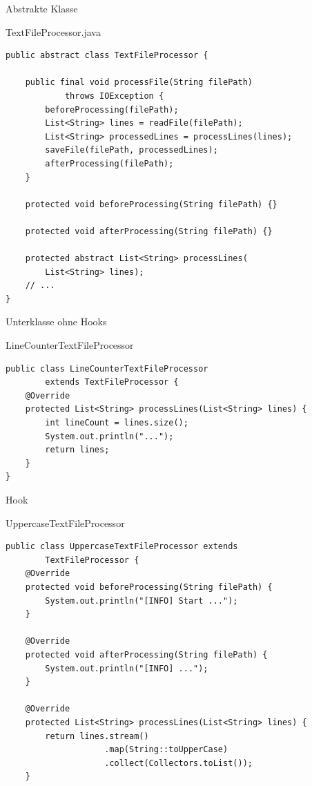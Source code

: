 \begin{frame}[fragile]{Abstrakte Klasse}
	\begin{exampleblock}{TextFileProcessor.java}
 		\begin{lstlisting}
public abstract class TextFileProcessor {

    public final void processFile(String filePath) 
            throws IOException {
        beforeProcessing(filePath);  
        List<String> lines = readFile(filePath);
        List<String> processedLines = processLines(lines);
        saveFile(filePath, processedLines);
        afterProcessing(filePath);   
    }

    protected void beforeProcessing(String filePath) {}

    protected void afterProcessing(String filePath) {}

    protected abstract List<String> processLines(
        List<String> lines);
    // ...
}    
 		\end{lstlisting}
 	\end{exampleblock}
\end{frame}

\begin{frame}[fragile]{Unterklasse ohne Hooks}
	\begin{exampleblock}{LineCounterTextFileProcessor}
 		\begin{lstlisting}
public class LineCounterTextFileProcessor 
        extends TextFileProcessor {
    @Override
    protected List<String> processLines(List<String> lines) {
        int lineCount = lines.size();
        System.out.println("...");
        return lines;
    }
}  
 		\end{lstlisting}
 	\end{exampleblock}
\end{frame}

\begin{frame}[fragile]{Hook}
	\begin{exampleblock}{UppercaseTextFileProcessor}
 		\begin{lstlisting}
public class UppercaseTextFileProcessor extends 
        TextFileProcessor {
    @Override
    protected void beforeProcessing(String filePath) {
        System.out.println("[INFO] Start ...");
    }

    @Override
    protected void afterProcessing(String filePath) {
        System.out.println("[INFO] ...");
    }

    @Override
    protected List<String> processLines(List<String> lines) {
        return lines.stream()
                    .map(String::toUpperCase)
                    .collect(Collectors.toList());
    }
 		\end{lstlisting}
 	\end{exampleblock}
\end{frame}

